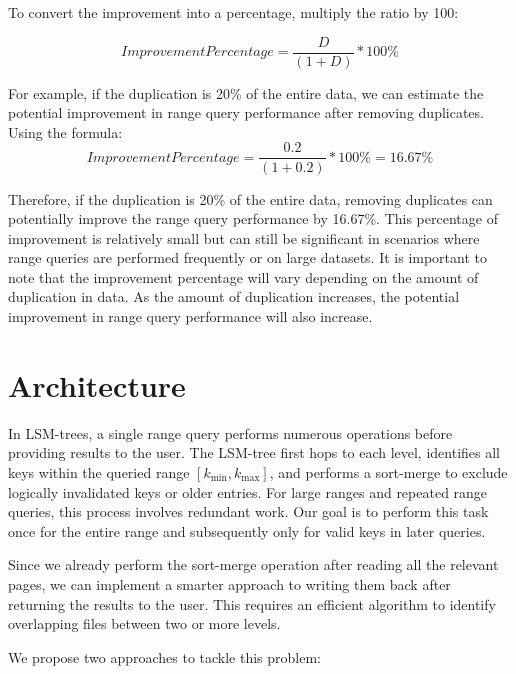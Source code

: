\documentclass[balance=false, sigconf]{acmart}
\begin{document}
To convert the improvement into a percentage, multiply the ratio by 100:

\begin{equation}
ImprovementPercentage = \frac{D}{(1 + D)} * 100\%
\end{equation}

For example, if the duplication is 20\% of the entire data, we can estimate the 
potential improvement in range query performance after removing duplicates. 
Using the formula:
\begin{equation}
ImprovementPercentage = \frac{0.2}{(1 + 0.2)} * 100\% = 16.67\%
\end{equation}

Therefore, if the duplication is 20\% of the entire data, removing duplicates 
can potentially improve the range query performance by 16.67\%. This percentage 
of improvement is relatively small but can still be significant in scenarios 
where range queries are performed frequently or on large datasets. It is important 
to note that the improvement percentage will vary depending on the amount of 
duplication in data. As the amount of duplication increases, the potential 
improvement in range query performance will also increase.

\section{Architecture}

In LSM-trees, a single range query performs numerous operations before providing 
results to the user. The LSM-tree first hops to each level, identifies all keys 
within the queried range $[k_\text{min}, k_\text{max}]$, and performs a sort-merge 
to exclude logically invalidated keys or older entries. For large ranges and repeated 
range queries, this process involves redundant work. Our goal is to perform this 
task once for the entire range and subsequently only for valid keys in later queries.

Since we already perform the sort-merge operation after reading all the relevant 
pages, we can implement a smarter approach to writing them back after returning 
the results to the user. This requires an efficient algorithm to identify overlapping 
files between two or more levels.

We propose two approaches to tackle this problem:
\end{document}

